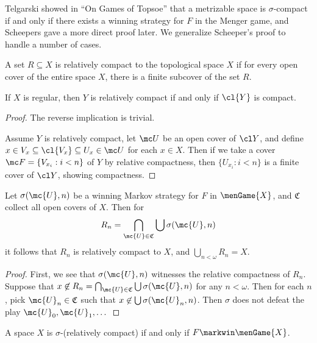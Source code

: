   Telgarski showed in ``On Games of Topsoe'' that a metrizable space is $\sigma$-compact if and only if there exists a winning strategy for $F$ in the Menger game, and Scheepers gave a more direct proof later. We generalize Scheeper's proof to handle a number of cases.

  \begin{defn}
    A set $R\subseteq X$ is relatively compact to the topological space $X$ if for every open cover of the entire space $X$, there is a finite subcover of the set $R$.
  \end{defn}

  \begin{prop}
    If $X$ is regular, then $Y$ is relatively compact if and only if $\cl{Y}$ is compact.
  \end{prop}

  \begin{proof}
    The reverse implication is trivial.

    Assume $Y$ is relatively compact, let $\mc U$ be an open cover of $\cl Y$, and define $x\in V_x\subseteq \cl{V_x}\subseteq U_x \in \mc U$ for each $x\in X$. Then if we take a cover $\mc F = \{V_{x_i} : i<n\}$ of $Y$ by relative compactness, then $\{U_{x_i}:i<n\}$ is a finite cover of $\cl Y$, showing compactness.
  \end{proof}

  \begin{lem}
    Let $\sigma(\mc{U}, n)$ be a winning Markov strategy for $F$ in $\menGame{X}$, and $\mathfrak{C}$ collect all open covers of $X$. Then for
      \[
        R_n = \bigcap_{\mc{U}\in\mathfrak{C}} \bigcup\sigma(\mc{U},n)
      \]
    it follows that $R_n$ is relatively compact to $X$, and $\bigcup_{n<\omega} R_n = X$.
  \end{lem}

  \begin{proof}
    First, we see that $\sigma(\mc{U},n)$ witnesses the relative compactness of $R_n$. Suppose that $x \not\in R_n = \bigcap_{\mc{U}\in\mathfrak{C}} \bigcup\sigma(\mc{U},n)$ for any $n<\omega$. Then for each $n$, pick $\mc{U}_n\in\mathfrak{C}$ such that $x\not\in \bigcup\sigma(\mc{U}_n,n)$. Then $\sigma$ does not defeat the play $\mc{U}_0,\mc{U}_1,\dots$
  \end{proof}

  \begin{cor}
    A space $X$ is $\sigma$-(relatively compact) if and only if $F \markwin \menGame{X}$.
  \end{cor}

